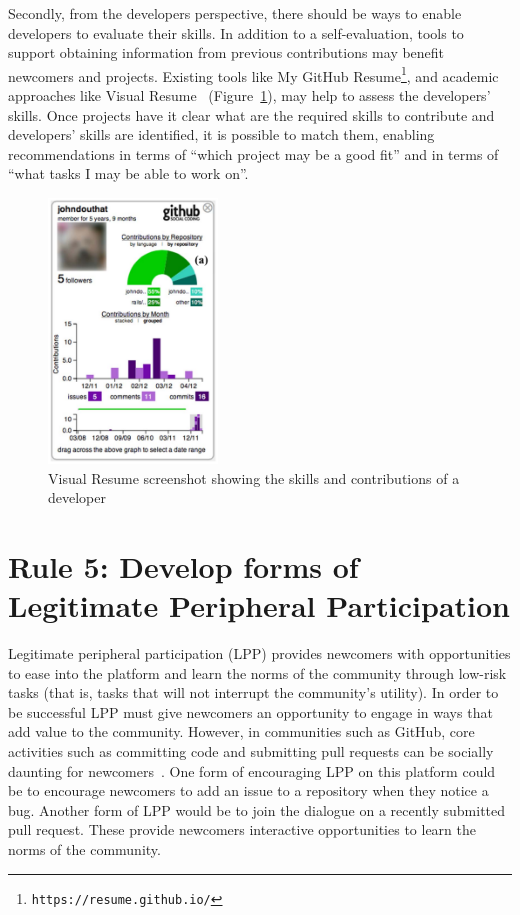 \documentclass[10pt,letterpaper]{article}
\newcommand{\rulemajor}[1]{\section*{#1}}
\newcommand{\withurl}[2]{{#1}\footnote{{\texttt{#2}}}}
\begin{document}
Secondly,
from the developers perspective,
there should be ways to enable developers to evaluate their skills.
In addition to a self-evaluation,
tools to support obtaining information from previous contributions may benefit newcomers and projects.
Existing tools like \withurl{My GitHub Resume}{https://resume.github.io/},
and academic approaches like Visual Resume~\cite{sarma2016} (Figure~\ref{fig:visualResume}),
may help to assess the developers' skills.
Once projects have it clear what are the required skills to contribute and developers' skills are identified,
it is possible to match them,
enabling recommendations in terms of ``which project may be a good fit''
and in terms of ``what tasks I may be able to work on''.


 \begin{figure}[hbt]
	\centering
   \includegraphics[width=4.5cm]{contributions.png}
	\caption{Visual Resume screenshot showing the skills and contributions of a developer}
	\label{fig:visualResume}
\end{figure}


\rulemajor{Rule 5: Develop forms of Legitimate Peripheral Participation}

Legitimate peripheral participation (LPP) provides newcomers with opportunities to ease into the platform and learn the norms of the community through low-risk tasks
(that is, tasks that will not interrupt the community's utility).
In order to be successful LPP must give newcomers an opportunity to engage in ways that add value to the community.
However,
in communities such as GitHub,
core activities such as committing code and submitting pull requests can be socially daunting for newcomers~\cite{steinmacher2015}.
One form of encouraging LPP on this platform could be to encourage newcomers to add an issue to a repository when they notice a bug.
Another form of LPP would be to join the dialogue on a recently submitted pull request.
These provide newcomers interactive opportunities to learn the norms of the community. 
\end{document}
